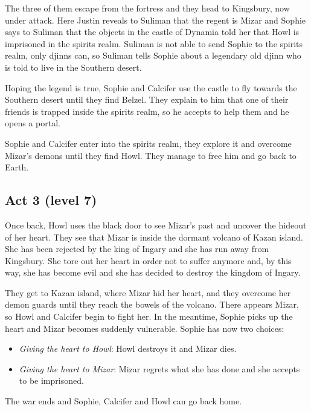 The three of them escape from the fortress and they head to Kingsbury, now under attack. Here Justin reveals to Suliman that the regent is Mizar and Sophie says to Suliman that the objects in the castle of Dynamia told her that Howl is imprisoned in the spirits realm. Suliman is not able to send Sophie to the spirits realm, only djinns can, so Suliman tells Sophie about a legendary old djinn who is told to live in the Southern desert.

Hoping the legend is true, Sophie and Calcifer use the castle to fly towards the Southern desert until they find Belzel. They explain to him that one of their friends is trapped inside the spirits realm, so he accepts to help them and he opens a portal.

Sophie and Calcifer enter into the spirits realm, they explore it and overcome Mizar's demons until they find Howl. They manage to free him and go back to Earth.

\subsection*{Act 3 (level 7)}
Once back, Howl uses the black door to see Mizar's past and uncover the hideout of her heart. They see that Mizar is inside the dormant volcano of Kazan island. She has been rejected by the king of Ingary and she has run away from Kingsbury. She tore out her heart in order not to suffer anymore and, by this way, she has become evil and she has decided to destroy the kingdom of Ingary.

They get to Kazan island, where Mizar hid her heart, and they overcome her demon guards until they reach the bowels of the volcano. There appears Mizar, so Howl and Calcifer begin to fight her. In the meantime, Sophie picks up the heart and Mizar becomes suddenly vulnerable. Sophie has now two choices:
\begin{itemize}
\item \textit{Giving the heart to Howl}: Howl destroys it and Mizar dies.
\item \textit{Giving the heart to Mizar}: Mizar regrets what she has done and she accepts to be imprisoned.
\end{itemize} 

The war ends and Sophie, Calcifer and Howl can go back home.